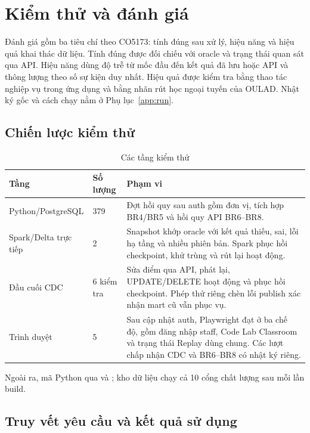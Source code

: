 \section{Kiểm thử và đánh giá}
\label{chap:eval}

Đánh giá gồm ba tiêu chí theo CO5173: tính đúng sau xử lý, hiệu năng và hiệu quả khai thác dữ liệu. Tính đúng được đối chiếu với oracle và trạng thái quan sát qua API. Hiệu năng dùng độ trễ từ mốc đầu đến kết quả đã lưu hoặc API và thông lượng theo số sự kiện duy nhất. Hiệu quả được kiểm tra bằng thao tác nghiệp vụ trong ứng dụng và bằng nhãn rút học ngoại tuyến của OULAD. Nhật ký gốc và cách chạy nằm ở Phụ lục~\ref{app:run}.

\subsection{Chiến lược kiểm thử}

\begin{table}[H]
\centering\small
\caption{Các tầng kiểm thử}\label{tab:tests}
\begin{tabularx}{\textwidth}{@{}L{3.3cm}L{1.6cm}Y@{}}
\toprule
\textbf{Tầng} & \textbf{Số lượng} & \textbf{Phạm vi} \\
\midrule
Python/PostgreSQL & 379 & Đợt hồi quy sau auth gồm đơn vị, tích hợp BR4/BR5 và hồi quy API BR6--BR8. \\
Spark/Delta trực tiếp & 2 & Snapshot khớp oracle với kết quả thiếu, sai, lỗi hạ tầng và nhiều phiên bản. Spark phục hồi checkpoint, khử trùng và rút lại hoạt động. \\
Đầu cuối CDC & 6 kiểm tra & Sửa điểm qua API, phát lại, UPDATE/DELETE hoạt động và phục hồi checkpoint. Phép thử riêng chèn lỗi publish xác nhận mart cũ vẫn phục vụ. \\
Trình duyệt & 5 & Sau cập nhật auth, Playwright đạt ở ba chế độ, gồm đăng nhập staff, Code Lab Classroom và trạng thái Replay dùng chung. Các lượt chấp nhận CDC và BR6--BR8 có nhật ký riêng. \\
\bottomrule
\end{tabularx}
\end{table}

Ngoài ra, mã Python qua  và ; kho dữ liệu chạy cả 10 cổng chất lượng sau mỗi lần build.

\subsection{Truy vết yêu cầu và kết quả sử dụng}

